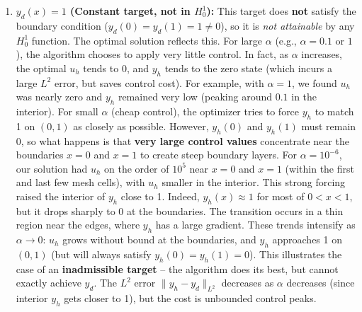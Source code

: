\documentclass[a4paper,10pt]{report}
\begin{document}
\begin{enumerate}
	\item \textbf{\(y_d(x)=1\) (Constant target, not in \(H^1_0\)):} This target does \textbf{not} satisfy the boundary condition (\(y_d(0)=y_d(1)=1\neq 0\)), so it is \textit{not attainable} by any \(H^1_0\) function. The optimal solution reflects this. For large \(\alpha\) (e.g., \(\alpha=0.1\) or \(1\)), the algorithm chooses to apply very little control. In fact, as \(\alpha\) increases, the optimal \(u_h\) tends to \(0\), and \(y_h\) tends to the zero state (which incurs a large \(L^2\) error, but saves control cost). For example, with \(\alpha=1\), we found \(u_h\) was nearly zero and \(y_h\) remained very low (peaking around \(0.1\) in the interior). For small \(\alpha\) (cheap control), the optimizer tries to force \(y_h\) to match 1 on \((0,1)\) as closely as possible. However, \(y_h(0)\) and \(y_h(1)\) must remain 0, so what happens is that \textbf{very large control values} concentrate near the boundaries \(x=0\) and \(x=1\) to create steep boundary layers. For \(\alpha=10^{-6}\), our solution had \(u_h\) on the order of \(10^5\) near \(x=0\) and \(x=1\) (within the first and last few mesh cells), with \(u_h\) smaller in the interior. This strong forcing raised the interior of \(y_h\) close to 1. Indeed, \(y_h(x)\approx 1\) for most of \(0<x<1\), but it drops sharply to \(0\) at the boundaries. The transition occurs in a thin region near the edges, where \(y_h\) has a large gradient. These trends intensify as \(\alpha\to 0\): \(u_h\) grows without bound at the boundaries, and \(y_h\) approaches 1 on \((0,1)\) (but will always satisfy \(y_h(0)=y_h(1)=0\)). This illustrates the case of an \textbf{inadmissible target} – the algorithm does its best, but cannot exactly achieve \(y_d\). The \(L^2\) error \(\|y_h-y_d\|_{L^2}\) decreases as \(\alpha\) decreases (since interior \(y_h\) gets closer to 1), but the cost is unbounded control peaks.


\end{enumerate}
\end{document}
